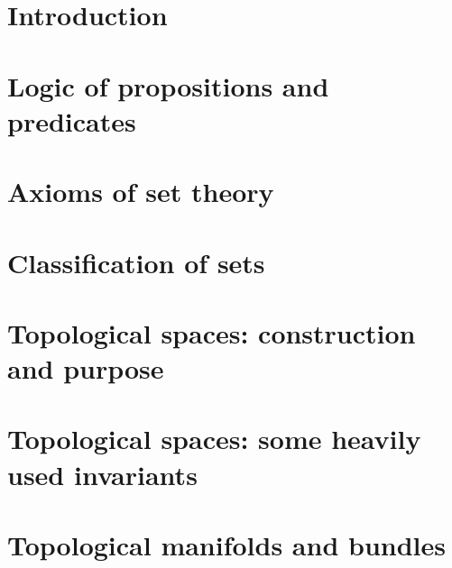 \documentclass[
11pt, %
a4paper, %
oneside, %
headinclude,footinclude, %
]{scrartcl}
\begin{document}


\newpage %


\section*{Introduction}

\newpage

\section{Logic of propositions and predicates}

\newpage

\section{Axioms of set theory}

\newpage

\section{Classification of sets}

\newpage

\section{Topological spaces: construction and purpose}

\newpage

\section{Topological spaces: some heavily used invariants}

\newpage

\section{Topological manifolds and bundles}

\end{document}
